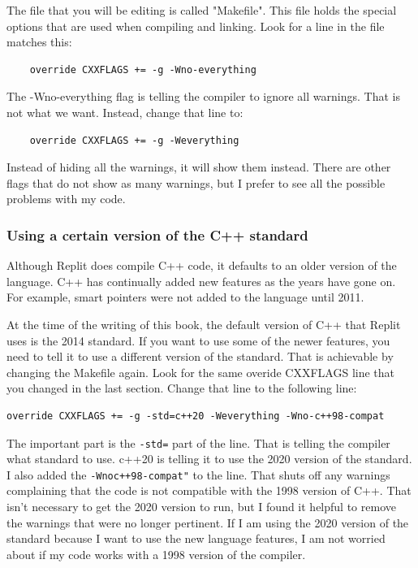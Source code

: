 The file that you will be editing is called "Makefile". This file holds the special options that are used when compiling and linking. Look for a line in the file matches this:

\begin{verbatim}
    override CXXFLAGS += -g -Wno-everything    
\end{verbatim}

The -Wno-everything flag is telling the compiler to ignore all warnings. That is not what we want. Instead, change that line to:

\begin{verbatim}
    override CXXFLAGS += -g -Weverything
\end{verbatim}

Instead of hiding all the warnings, it will show them instead. There are other flags that do not show as many warnings, but I prefer to see all the possible problems with my code.

\subsubsection{Using a certain version of the C++ standard}
\label{changestandard}
Although Replit does compile C++ code, it defaults to an older version of the language. C++ has continually added new features as the years have gone on. For example, smart pointers were not added to the language until 2011.

At the time of the writing of this book, the default version of C++ that Replit uses is the 2014 standard. If you want to use some of the newer features, you need to tell it to use a different version of the standard. That is achievable by changing the Makefile again. Look for the same overide CXXFLAGS line that you changed in the last section. Change that line to the following line:

\begin{verbatim}
override CXXFLAGS += -g -std=c++20 -Weverything -Wno-c++98-compat
\end{verbatim}

The important part is the {\tt -std=} part of the line. That is telling the compiler what standard to use. c++20 is telling it to use the 2020 version of the standard. I also added the {\tt -Wnoc++98-compat"} to the line. That shuts off any warnings complaining that the code is not compatible with the 1998 version of C++. That isn't necessary to get the 2020 version to run, but I found it helpful to remove the warnings that were no longer pertinent. If I am using the 2020 version of the standard because I want to use the new language features, I am not worried about if my code works with a 1998 version of the compiler.

